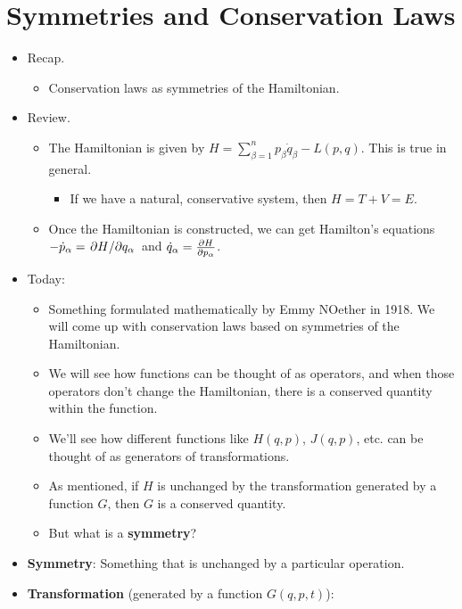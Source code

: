 \documentclass[../notes.tex]{subfiles}
\begin{document}
\section{Symmetries and Conservation Laws}
\begin{itemize}
    \item {}Recap.
    \begin{itemize}
        \item Conservation laws as symmetries of the Hamiltonian.
    \end{itemize}
    \item Review.
    \begin{itemize}
        \item The Hamiltonian is given by $H=\sum_{\beta=1}^np_\beta\dot{q}_\beta-L(p,q)$. This is true in general.
        \begin{itemize}
            \item If we have a natural, conservative system, then $H=T+V=E$.
        \end{itemize}
        \item Once the Hamiltonian is constructed, we can get Hamilton's equations $-\dot{p}_\alpha=\pdv*{H}{q_\alpha}$ and $\dot{q}_\alpha=\pdv{H}{p_\alpha}$.
    \end{itemize}
    \item Today:
    \begin{itemize}
        \item Something formulated mathematically by Emmy NOether in 1918. We will come up with conservation laws based on symmetries of the Hamiltonian.
        \item We will see how functions can be thought of as operators, and when those operators don't change the Hamiltonian, there is a conserved quantity within the function.
        \item We'll see how different functions like $H(q,p)$, $J(q,p)$, etc. can be thought of as generators of transformations.
        \item As mentioned, if $H$ is unchanged by the transformation generated by a function $G$, then $G$ is a conserved quantity.
        \item But what is a \textbf{symmetry}?
    \end{itemize}
    \item \textbf{Symmetry}: Something that is unchanged by a particular operation.
    \item \textbf{Transformation} (generated by a function $G(q,p,t)$):
    \begin{align*}

\end{align*}
\end{itemize}
\end{document}
